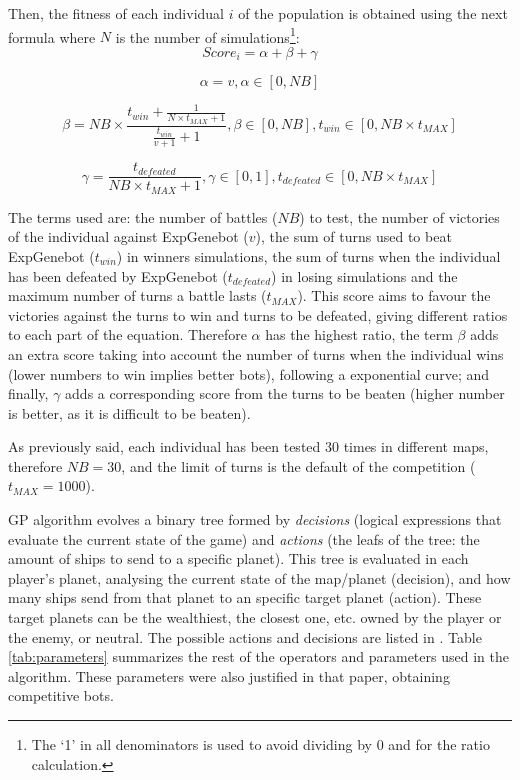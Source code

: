 \documentclass[runningheads,a4paper]{llncs}
\begin{document}
Then, the fitness of each individual $i$ of the population is obtained using the next formula where $N$ is the number of simulations\footnote{The 
`1' in all denominators is used to avoid dividing by 0 and for the ratio calculation.}:
\begin{equation}
Score_{i}=\alpha+\beta+\gamma\label{eq:score}
\end{equation}

\begin{equation}
\alpha=v,\alpha\in\left[0,NB\right]
\end{equation}

\begin{equation}
\beta=NB\times\frac{t_{win}+\frac{1}{N\times t_{MAX}+1}}{\frac{t_{win}}{v+1}+1},\beta\in\left[0,NB\right],t_{win}\in\left[0,NB\times t_{MAX}\right]
\end{equation}


\begin{equation}
\gamma=\frac{t_{defeated}}{NB\times t_{MAX}+1},\gamma\in\left[0,1\right],t_{defeated}\in\left[0,NB\times t_{MAX}\right]
\end{equation}

The terms used are: the number of battles ($NB$) to test, the number of
victories of the individual against ExpGenebot ($v$), the sum of
turns used to beat ExpGenebot ($t_{win}$) in winners simulations, the sum of turns when
the individual has been defeated by ExpGenebot ($t_{defeated}$) in losing simulations and the
maximum number of turns a battle lasts ($t_{MAX}$). This score aims to
favour the victories against the turns to win and turns to be
defeated, giving different ratios to each part of the equation. 
Therefore $\alpha$ has the highest ratio, the term $\beta$ adds an extra score taking into account the number of turns when the individual wins (lower numbers to win implies better bots), following a exponential curve; and finally, $\gamma$ adds a corresponding score from the turns to be beaten 
(higher number is better, as it is difficult to be beaten). 

As previously said, each individual has been tested 30 times in different maps, therefore $NB=30$, and the limit of turns is the default of the competition ($t_{MAX}=1000$).

GP algorithm evolves a binary tree formed by {\em decisions} (logical expressions that evaluate the current state of the game) and {\em actions} (the leafs of the tree: the amount of ships to send to a specific planet). This tree is evaluated in each player's planet, analysing the current state of the map/planet (decision), and how many ships send from that planet to an specific target planet (action). These target planets can be the wealthiest, the closest one, etc. owned by the player or the enemy, or neutral. The possible actions and decisions are listed in \cite{EvoStar2014:GPBot}. Table \ref{tab:parameters} summarizes the rest of the operators and parameters used in the algorithm. These parameters were also justified in that paper, obtaining competitive bots.
\end{document}
